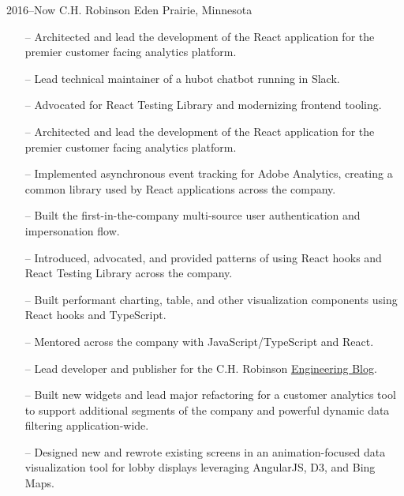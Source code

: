 \documentclass[]{cv-style} %
\begin{document}
\begin{entrylist}

\entry
{2016--Now}
{C.H. Robinson}
{Eden Prairie, Minnesota}
{
\begin{itemize}
    \item[--] Architected and lead the development of the React application for the premier customer facing analytics platform.
    \item[--] Lead technical maintainer of a hubot chatbot running in Slack.
    \item[--] Advocated for React Testing Library and modernizing frontend tooling.
\end{itemize}
\begin{itemize}
    \item[--] Architected and lead the development of the React application for the premier customer facing analytics platform.
    \item[--] Implemented asynchronous event tracking for Adobe Analytics, creating a common library used by React applications across the company.
    \item[--] Built the first-in-the-company multi-source user authentication and impersonation flow.
    \item[--] Introduced, advocated, and provided patterns of using React hooks and React Testing Library across the company.
    \item[--] Built performant charting, table, and other visualization components using React hooks and TypeScript.
    \item[--] Mentored across the company with JavaScript/TypeScript and React.
    \item[--] Lead developer and publisher for the C.H. Robinson \href{https://engineering.chrobinson.com}{Engineering Blog}.
\end{itemize}
\begin{itemize}
    \item[--] Built new widgets and lead major refactoring for a customer analytics tool to support additional segments of the company and powerful dynamic data filtering application-wide.
    \item[--] Designed new and rewrote existing screens in an animation-focused data visualization tool for lobby displays leveraging AngularJS, D3, and Bing Maps.
\end{itemize}}


\end{entrylist}
\end{document}
